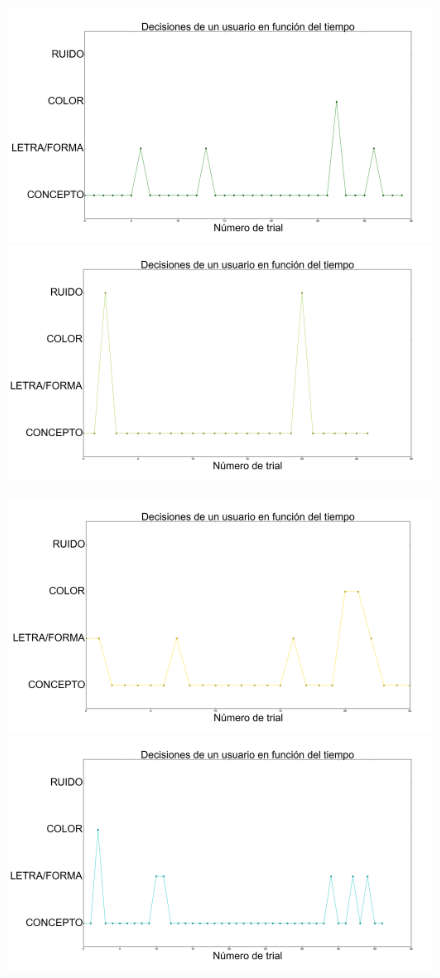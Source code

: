 \documentclass{beamer}
\begin{document}
\begin{frame}
\begin{figure}[h]
 \centering
  \begin{minipage}[c]{1\textwidth}
	\includegraphics[scale=0.108]{user2.png}
	\includegraphics[scale=0.108]{user12.png}
  \end{minipage}
  \begin{minipage}[c]{1\textwidth}
	\includegraphics[scale=0.108]{user4.png}
	\includegraphics[scale=0.108]{user5.png}

\end{minipage}
\end{figure}
\end{frame}
\end{document}
